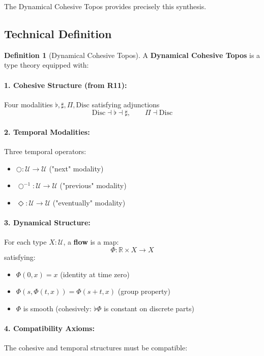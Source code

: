 \documentclass[11pt]{article}
\theoremstyle{definition}
\newtheorem{definition}[theorem]{Definition}
\begin{document}
The Dynamical Cohesive Topos provides precisely this synthesis.

\subsection{Technical Definition}

\begin{definition}[Dynamical Cohesive Topos]
\label{def:dct}
A \textbf{Dynamical Cohesive Topos} is a type theory equipped with:

\paragraph{1. Cohesive Structure (from R11):}
Four modalities $\flat, \sharp, \Pi, \text{Disc}$ satisfying adjunctions
\[
\text{Disc} \dashv \flat \dashv \sharp, \qquad \Pi \dashv \text{Disc}
\]

\paragraph{2. Temporal Modalities:}
Three temporal operators:
\begin{itemize}
\item $\bigcirc : \mathcal{U} \to \mathcal{U}$ ("next" modality)
\item $\bigcirc^{-1} : \mathcal{U} \to \mathcal{U}$ ("previous" modality)  
\item $\Diamond : \mathcal{U} \to \mathcal{U}$ ("eventually" modality)
\end{itemize}

\paragraph{3. Dynamical Structure:}
For each type $X : \mathcal{U}$, a \textbf{flow} is a map:
\[
\Phi : \mathbb{R} \times X \to X
\]
satisfying:
\begin{itemize}
\item $\Phi(0, x) = x$ (identity at time zero)
\item $\Phi(s, \Phi(t, x)) = \Phi(s+t, x)$ (group property)
\item $\Phi$ is smooth (cohesively: $\flat\Phi$ is constant on discrete parts)
\end{itemize}

\paragraph{4. Compatibility Axioms:}
The cohesive and temporal structures must be compatible:


\end{definition}
\end{document}
